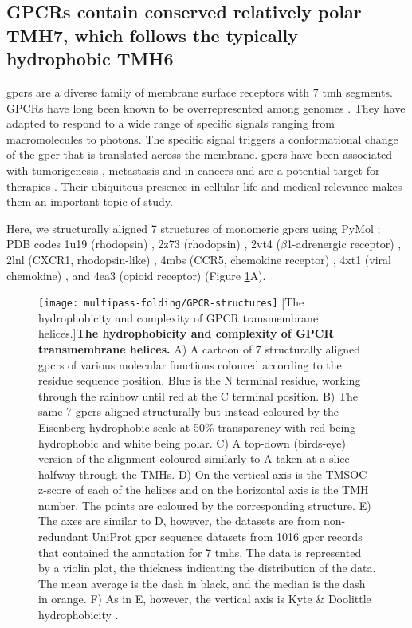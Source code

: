 \subsection{GPCRs contain conserved relatively polar TMH7, which follows the typically hydrophobic TMH6}

\gls{gpcr}s are a diverse family of membrane surface receptors with 7 \gls{tmh} segments.
GPCRs have long been known to be overrepresented among genomes \cite{Remm2000}.
They have adapted to respond to a wide range of specific signals ranging from macromolecules to photons.
The specific signal triggers a conformational change of the \gls{gpcr} that is translated across the membrane.
\gls{gpcr}s have been associated with tumorigenesis \cite{OHayre2013}, metastasis \cite{Singh2015} and in cancers \cite{Bar-Shavit2016} and are a potential target for therapies \cite{Arakaki2018}.
Their ubiquitous presence in cellular life and medical relevance makes them an important topic of study.

Here, we structurally aligned 7 structures of monomeric \gls{gpcr}s using PyMol \cite{DeLano2002};
PDB codes 1u19 (rhodopsin) \cite{Okada2004}, 2z73 (rhodopsin) \cite{Murakami2008}, 2vt4 ($\beta$1-adrenergic receptor) \cite{Warne2008}, 2lnl (CXCR1, rhodopsin-like) \cite{Park2012}, 4mbs (CCR5, chemokine receptor) \cite{Tan2013}, 4xt1 (viral chemokine) \cite{Burg2015}, and 4ea3 (opioid receptor) \cite{Thompson2012} (Figure \ref{fig:GPCR-structures}A).

\begin{figure}[!ht]
\centering
\texttt{[image: multipass-folding/GPCR-structures]}
		[The hydrophobicity and complexity of GPCR transmembrane helices.]{\textbf{The hydrophobicity and complexity of GPCR transmembrane helices.}
    A) A cartoon of 7 structurally aligned \gls{gpcr}s of various molecular functions coloured according to the residue sequence position.
    Blue is the N terminal residue, working through the rainbow until red at the C terminal position.
    B) The same 7 \gls{gpcr}s aligned structurally but instead coloured by the Eisenberg hydrophobic scale \cite{Eisenberg1984} at 50\% transparency with red being hydrophobic and white being polar.
    C) A top\--down (birds\--eye) version of the alignment coloured similarly to A taken at a slice halfway through the TMHs.
    D) On the vertical axis is the TMSOC z\--score of each of the helices and on the horizontal axis is the TMH number.
    The points are coloured by the corresponding structure.
    E) The axes are similar to D, however, the datasets are from non-redundant UniProt \gls{gpcr} sequence datasets from 1016 \gls{gpcr} records that contained the annotation for 7 \gls{tmh}s.
    The data is represented by a violin plot, the thickness indicating the distribution of the data.
    The mean average is the dash in black, and the median is the dash in orange.
    F) As in E, however, the vertical axis is Kyte \& Doolittle hydrophobicity \cite{Kyte1982}.}

\label{fig:GPCR-structures}
\end{figure}

